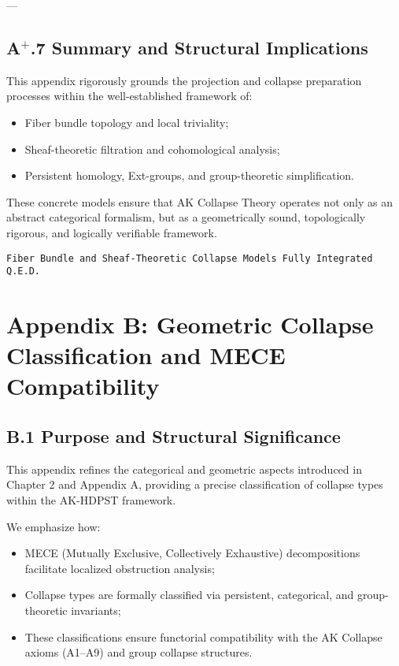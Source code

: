 \documentclass[11pt]{article}
\begin{document}
---

\subsection*{A$^{+}$.7 Summary and Structural Implications}

This appendix rigorously grounds the projection and collapse preparation processes within the well-established framework of:

\begin{itemize}
    \item Fiber bundle topology and local triviality;
    \item Sheaf-theoretic filtration and cohomological analysis;
    \item Persistent homology, Ext-groups, and group-theoretic simplification.
\end{itemize}

These concrete models ensure that AK Collapse Theory operates not only as an abstract categorical formalism, but as a geometrically sound, topologically rigorous, and logically verifiable framework.

\begin{flushright}
\texttt{Fiber Bundle and Sheaf-Theoretic Collapse Models \quad Fully Integrated \quad Q.E.D.}
\end{flushright}



\section*{Appendix B: Geometric Collapse Classification and MECE Compatibility}

\subsection*{B.1 Purpose and Structural Significance}

This appendix refines the categorical and geometric aspects introduced in Chapter 2 and Appendix A, providing a precise classification of collapse types within the AK-HDPST framework.

We emphasize how:

\begin{itemize}
    \item MECE (Mutually Exclusive, Collectively Exhaustive) decompositions facilitate localized obstruction analysis;
    \item Collapse types are formally classified via persistent, categorical, and group-theoretic invariants;
    \item These classifications ensure functorial compatibility with the AK Collapse axioms (A1–A9) and group collapse structures.
\end{itemize}
\end{document}
